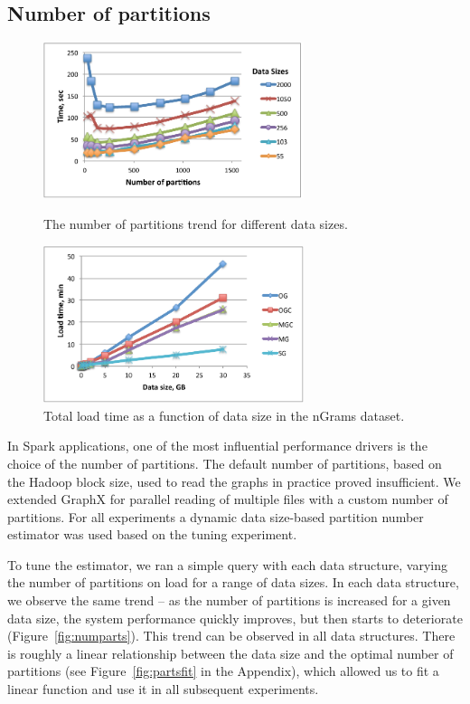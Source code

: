 \subsection{Number of partitions}

\begin{figure}[th!]
\centering
\begin{minipage}{3.3in}
  \centering
  \includegraphics[width=3in]{figs/numparts.pdf}
  \caption{The number of partitions trend for different data sizes.}
  \label{fig:numparts}
\end{minipage}
\begin{minipage}{3.3in}
  \centering
  \includegraphics[width=3in]{figs/tselect.pdf}
  \caption{Total load time as a function of data size in the nGrams
    dataset.}
  \label{fig:tselect}
\end{minipage}
\end{figure}

In Spark applications, one of the most influential performance drivers
is the choice of the number of partitions.  The default number of
partitions, based on the Hadoop block size, used to read the graphs in
practice proved insufficient.  We extended GraphX for parallel reading
of multiple files with a custom number of partitions.  For all
experiments a dynamic data size-based partition number estimator was
used based on the tuning experiment.

To tune the estimator, we ran a simple  query with each
data structure, varying the number of partitions on load for a range
of data sizes.  In each data structure, we observe the same trend --
as the number of partitions is increased for a given data size, the
system performance quickly improves, but then starts to deteriorate
(Figure~\ref{fig:numparts}).  This trend can be observed in all data
structures.  There is roughly a linear relationship between the data
size and the optimal number of partitions (see
Figure~\ref{fig:partsfit} in the Appendix), which allowed us to fit a
linear function and use it in all subsequent experiments.

